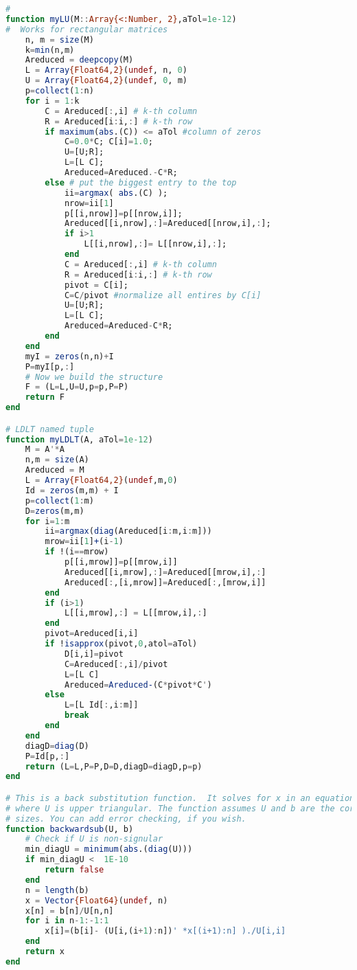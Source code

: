 \begin{lstlisting}[language=Julia,style=mystyle]
#
function myLU(M::Array{<:Number, 2},aTol=1e-12)
#  Works for rectangular matrices  
    n, m = size(M)
    k=min(n,m)
    Areduced = deepcopy(M)
    L = Array{Float64,2}(undef, n, 0)
    U = Array{Float64,2}(undef, 0, m)
    p=collect(1:n)     
    for i = 1:k
        C = Areduced[:,i] # k-th column
        R = Areduced[i:i,:] # k-th row
        if maximum(abs.(C)) <= aTol #column of zeros
            C=0.0*C; C[i]=1.0;
            U=[U;R];  
            L=[L C];
            Areduced=Areduced.-C*R;
        else # put the biggest entry to the top  
            ii=argmax( abs.(C) );
            nrow=ii[1] 
            p[[i,nrow]]=p[[nrow,i]];
            Areduced[[i,nrow],:]=Areduced[[nrow,i],:];
            if i>1
                L[[i,nrow],:]= L[[nrow,i],:];
            end
            C = Areduced[:,i] # k-th column
            R = Areduced[i:i,:] # k-th row
            pivot = C[i];
            C=C/pivot #normalize all entires by C[i]
            U=[U;R]; 
            L=[L C];
            Areduced=Areduced-C*R;
        end
    end
    myI = zeros(n,n)+I
    P=myI[p,:]
    # Now we build the structure
    F = (L=L,U=U,p=p,P=P)
    return F
end

# LDLT named tuple
function myLDLT(A, aTol=1e-12)
    M = A'*A
    n,m = size(A)
    Areduced = M
    L = Array{Float64,2}(undef,m,0)
    Id = zeros(m,m) + I
    p=collect(1:m)    
    D=zeros(m,m)
    for i=1:m
        ii=argmax(diag(Areduced[i:m,i:m]))
        mrow=ii[1]+(i-1)
        if !(i==mrow)
            p[[i,mrow]]=p[[mrow,i]]
            Areduced[[i,mrow],:]=Areduced[[mrow,i],:]
            Areduced[:,[i,mrow]]=Areduced[:,[mrow,i]]
        end
        if (i>1)
            L[[i,mrow],:] = L[[mrow,i],:]
        end
        pivot=Areduced[i,i]
        if !isapprox(pivot,0,atol=aTol)
            D[i,i]=pivot
            C=Areduced[:,i]/pivot
            L=[L C]
            Areduced=Areduced-(C*pivot*C')
        else
            L=[L Id[:,i:m]]
            break
        end
    end
    diagD=diag(D)
    P=Id[p,:]
    return (L=L,P=P,D=D,diagD=diagD,p=p)
end

# This is a back substitution function.  It solves for x in an equation Ux = b, 
# where U is upper triangular. The function assumes U and b are the correct 
# sizes. You can add error checking, if you wish.
function backwardsub(U, b)
    # Check if U is non-signular
    min_diagU = minimum(abs.(diag(U)))
    if min_diagU <  1E-10
        return false
    end
    n = length(b)
    x = Vector{Float64}(undef, n) 
    x[n] = b[n]/U[n,n]
    for i in n-1:-1:1
        x[i]=(b[i]- (U[i,(i+1):n])' *x[(i+1):n] )./U[i,i]
    end
    return x
end


\end{lstlisting}
